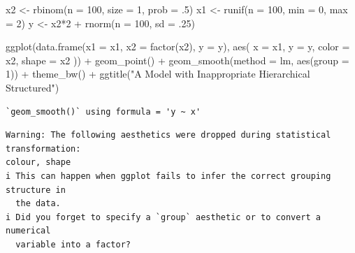 \documentclass[
  letterpaper,
  DIV=11,
  numbers=noendperiod]{scrreport}
\newenvironment{Shaded}{\begin{snugshade}}{\end{snugshade}}
\newcommand{\AttributeTok}[1]{\textcolor[rgb]{0.40,0.45,0.13}{#1}}
\newcommand{\DecValTok}[1]{\textcolor[rgb]{0.68,0.00,0.00}{#1}}
\newcommand{\FunctionTok}[1]{\textcolor[rgb]{0.28,0.35,0.67}{#1}}
\newcommand{\NormalTok}[1]{\textcolor[rgb]{0.00,0.23,0.31}{#1}}
\newcommand{\OtherTok}[1]{\textcolor[rgb]{0.00,0.23,0.31}{#1}}
\newcommand{\SpecialCharTok}[1]{\textcolor[rgb]{0.37,0.37,0.37}{#1}}
\newcommand{\StringTok}[1]{\textcolor[rgb]{0.13,0.47,0.30}{#1}}
\begin{document}
\begin{Shaded}
\begin{Highlighting}[]
\NormalTok{x2 }\OtherTok{\textless{}{-}} \FunctionTok{rbinom}\NormalTok{(}\AttributeTok{n =} \DecValTok{100}\NormalTok{, }\AttributeTok{size =} \DecValTok{1}\NormalTok{, }\AttributeTok{prob =}\NormalTok{ .}\DecValTok{5}\NormalTok{)}
\NormalTok{x1 }\OtherTok{\textless{}{-}} \FunctionTok{runif}\NormalTok{(}\AttributeTok{n =} \DecValTok{100}\NormalTok{, }\AttributeTok{min =} \DecValTok{0}\NormalTok{, }\AttributeTok{max =} \DecValTok{2}\NormalTok{) }
\NormalTok{y }\OtherTok{\textless{}{-}}\NormalTok{ x2}\SpecialCharTok{*}\DecValTok{2} \SpecialCharTok{+} \FunctionTok{rnorm}\NormalTok{(}\AttributeTok{n =} \DecValTok{100}\NormalTok{, }\AttributeTok{sd =}\NormalTok{ .}\DecValTok{25}\NormalTok{)}

\FunctionTok{ggplot}\NormalTok{(}\FunctionTok{data.frame}\NormalTok{(}\AttributeTok{x1 =}\NormalTok{ x1, }\AttributeTok{x2 =} \FunctionTok{factor}\NormalTok{(x2), }\AttributeTok{y =}\NormalTok{ y),}
       \FunctionTok{aes}\NormalTok{(}
         \AttributeTok{x =}\NormalTok{ x1,}
         \AttributeTok{y =}\NormalTok{ y,}
         \AttributeTok{color =}\NormalTok{ x2,}
         \AttributeTok{shape =}\NormalTok{ x2}
\NormalTok{       )) }\SpecialCharTok{+} 
  \FunctionTok{geom\_point}\NormalTok{() }\SpecialCharTok{+} 
  \FunctionTok{geom\_smooth}\NormalTok{(}\AttributeTok{method =} \StringTok{\textquotesingle{}lm\textquotesingle{}}\NormalTok{, }\FunctionTok{aes}\NormalTok{(}\AttributeTok{group =} \DecValTok{1}\NormalTok{)) }\SpecialCharTok{+} 
  \FunctionTok{theme\_bw}\NormalTok{() }\SpecialCharTok{+}
  \FunctionTok{ggtitle}\NormalTok{(}\StringTok{"A Model with Inappropriate Hierarchical Structured"}\NormalTok{)}
\end{Highlighting}
\end{Shaded}

\begin{verbatim}
`geom_smooth()` using formula = 'y ~ x'
\end{verbatim}

\begin{verbatim}
Warning: The following aesthetics were dropped during statistical transformation:
colour, shape
i This can happen when ggplot fails to infer the correct grouping structure in
  the data.
i Did you forget to specify a `group` aesthetic or to convert a numerical
  variable into a factor?
\end{verbatim}
\end{document}
